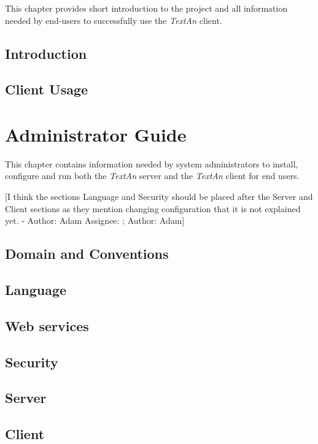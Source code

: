 \documentclass[12pt,a4paper]{report}
\makeatletter
\newcommand{\comment}[3][\@empty]{
  {\color{magenta}[#3 - }
  {\color{green}\ifx\@empty#1\relax Author: #2 \else Assignee: #1; Author: #2\fi}{\color{magenta}]}
}
\newcommand{\textan}{\emph{TextAn}}
\makeatother
\begin{document}
This chapter provides short introduction to the project and all information
needed by end-users to successfully use the \textan{} client.

\section{Introduction}


\section{Client Usage}


\chapter{Administrator Guide}

This chapter contains information needed by system administrators to install,
configure and run both the \textan{} server and the \textan{} client for end
users.

\comment{Adam}{I think the sections Language and Security should be placed
after the Server and Client sections as they mention changing configuration
that it is not explained yet.}

\section{Domain and Conventions}

\label{sec:Domain}

\section{Language}
\label{sec:Lang}


\section{Web services}


\section{Security}
\label{sec:Security}


\section{Server}


\section{Client}

\end{document}

